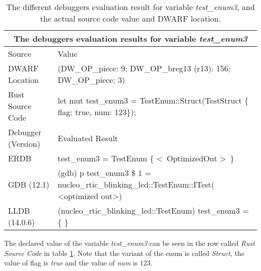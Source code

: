 \begin{table}[h]
	\centering
	\small
	\begin{tabular}{ |p{2cm}|p{8cm}|  }
		\hline
		\multicolumn{2}{|c|}{\textbf{The debuggers evaluation results for variable \emph{test\_enum3}}} \\ 
		\hline
		\hline
		Source & Value \\
		\hline

		DWARF Location & (DW\_OP\_piece: 9; DW\_OP\_breg13 (r13): 156; DW\_OP\_piece: 3) \\

		Rust Source Code & let mut test\_enum3 = TestEnum::Struct(TestStruct \{ flag: true, num: 123\}); \\
		\hline
		\hline
		Debugger (Version) & Evaluated Result \\
		\hline
		ERDB & test\_enum3 = 
		TestEnum \{ \textless \ OptimizedOut \textgreater \ \}\\

		GDB (12.1)  & (gdb) p test\_enum3\newline
		\$ 1 = nucleo\_rtic\_blinking\_led::TestEnum::ITest(\newline
		\textless optimized out\textgreater) \\

		LLDB (14.0.6) & (nucleo\_rtic\_blinking\_led::TestEnum) test\_enum3 = \{\newline
		\text{\ \ ITest = (0 = 0)}\newline
		\text{\ \ UTest = (0 = 0)}\newline
		\text{\ \ Struct = \{}\newline
		\text{\ \ \ \ 0 = (flag = false, num = 0)}\newline
		\text{\ \ \}}\newline
		\text{\ \ Non = \{\}}\newline
		\} \\
		\hline
	\end{tabular}
	\caption{The different debuggers evaluation result for variable \emph{test\_enum3}, and the actual source code value and DWARF location.}
	\label{table:enum3}
\end{table}


The declared value of the variable \emph{test\_enum3} can be seen in the row called \emph{Rust Source Code} in table \ref{table:enum3}.
Note that the variant of the enum is called \emph{Struct}, the value of flag is \emph{true} and the value of \emph{num} is $123$.


